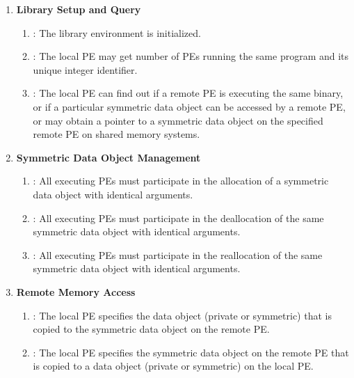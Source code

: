 \begin{enumerate}
\item \textbf{Library Setup and Query}

\begin{enumerate}
\item {}: The \openshmem library environment is initialized. 
\item {}: The local \ac{PE} may get number of \acp{PE} running the same program and its unique integer identifier. 
\item {}: The local \ac{PE} can find out if a remote \ac{PE} is executing the same binary, or if a particular symmetric data object can be accessed by a remote \ac{PE}, or may obtain a pointer to a symmetric data object on the specified remote \ac{PE} on shared memory systems.
\end{enumerate}

\item \textbf{Symmetric Data Object Management}
\begin{enumerate}
\item {}: All executing \ac{PE}s must participate in the allocation of a symmetric data object with identical arguments.
\item  {}: All executing \ac{PE}s must participate in the deallocation of the same symmetric data object with identical arguments.
\item  {}: All executing \ac{PE}s must participate in the reallocation of the same symmetric data object with identical arguments.
\end{enumerate}

\item \textbf{Remote Memory Access}

\begin{enumerate}
\item \PUT: The local \ac{PE} specifies the \source{}
data object (private or symmetric) that is copied to the symmetric data object on the remote \ac{PE}. 
\item \GET: The local \ac{PE} specifies the symmetric data object on the remote \ac{PE}
that is copied to a data object (private or symmetric) on the local \ac{PE}. 
\end{enumerate}


\end{enumerate}

